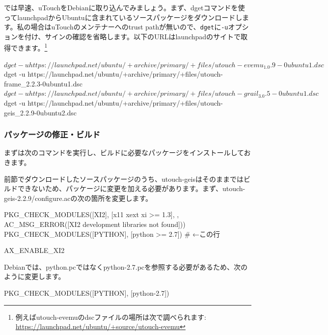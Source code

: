 \documentclass[mingoth,a4paper]{jsarticle}
\begin{document}
では早速、uTouchをDebianに取り込んでみましょう。まず、dgetコマンドを使ってlaunchpadからUbuntuに含まれているソースパッケージをダウンロードします。私の場合はuTouchのメンテナーへのtrust pathが無いので、\texttt{dget}に\texttt{-u}オプションを付け、サインの確認を省略します。以下のURLはlaunchpadのサイトで取得できます。\footnote{例えばutouch-evemuのdscファイルの場所は次で調べられます: \url{https://launchpad.net/ubuntu/+source/utouch-evemu}}

\begin{commandline}
$ dget -u https://launchpad.net/ubuntu/+archive/primary/+files/utouch-evemu_1.0.9-0ubuntu1.dsc
$ dget -u https://launchpad.net/ubuntu/+archive/primary/+files/utouch-frame_2.2.3-0ubuntu1.dsc
$ dget -u https://launchpad.net/ubuntu/+archive/primary/+files/utouch-grail_3.0.5-0ubuntu1.dsc
$ dget -u https://launchpad.net/ubuntu/+archive/primary/+files/utouch-geis_2.2.9-0ubuntu2.dsc
\end{commandline}

\subsubsection{パッケージの修正・ビルド}

まずは次のコマンドを実行し、ビルドに必要なパッケージをインストールしておきます。


前節でダウンロードしたソースパッケージのうち、utouch-geisはそのままではビルドできないため、パッケージに変更を加える必要があります。まず、utouch-geis-2.2.9/configure.acの次の箇所を変更します。

\begin{commandline}
PKG_CHECK_MODULES([XI2], [x11 xext xi >= 1.3], ,
		  AC_MSG_ERROR([XI2 development libraries not found]))
PKG_CHECK_MODULES([PYTHON], [python >= 2.7]) # ←この行

AX_ENABLE_XI2
\end{commandline}

Debianでは、python.pcではなくpython-2.7.pcを参照する必要があるため、次のように変更します。

\begin{commandline}
PKG_CHECK_MODULES([PYTHON], [python-2.7])
\end{commandline}
\end{document}
